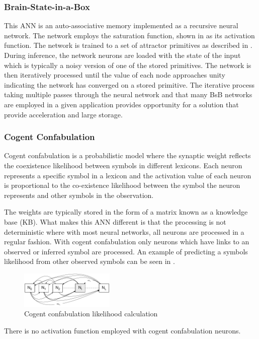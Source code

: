 \subsubsection*{Brain-State-in-a-Box}

This ANN is an auto-associative memory implemented as a recursive neural network. The network employs the saturation function, shown in  
as its activation function.
The network is trained to a set of attractor primitives as described in \cite{lillo1994synthesis}.
During inference, the network neurons are loaded with the state of the input which is typically a noisy version of one of the stored primitives.
The network is then iteratively processed until the value of each node approaches unity indicating the network has converged on a stored primitive.
The iterative process taking multiple passes through the neural network and that many BsB networks are employed in a given application
provides opportunity for a solution that provide acceleration and large storage.


\subsubsection*{Cogent Confabulation}

Cogent confabulation is a probabilistic model where the synaptic weight reflects the coexistence likelihood between symbols in different lexicons.
Each neuron represents a specific symbol in a lexicon and the activation value of each neuron is proportional to the co-existence likelihood between
the symbol the neuron represents and other symbols in the observation.

The weights are typically stored in the form of a matrix known as a knowledge base (KB).
What makes this ANN different is that the processing is not deterministic where with most neural networks, all neurons are processed in a regular fashion.
With cogent confabulation only neurons which have links to an observed or inferred symbol are processed.
An example of predicting a symbols likelihood from other observed symbols can be seen in .
\begin{figure}[hbtp]
\centering
\includegraphics[width=0.4\textwidth]{Chapter-1/figs/CCnetwork}
\captionsetup{justification=centering, skip=3pt}
\caption{Cogent confabulation likelihood calculation}
\label{fig:Cogent confabulation likelihood calculation}
\end{figure}
There is no activation function employed with cogent confabulation neurons.

